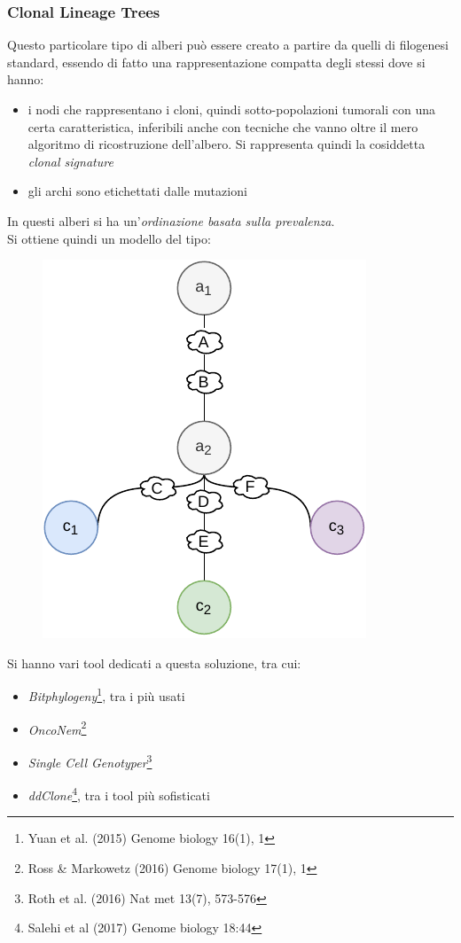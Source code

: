 \documentclass[a4paper,12pt, oneside]{book}
\begin{document}
\subsubsection{Clonal Lineage Trees}
Questo particolare tipo di alberi può essere creato a partire da quelli di
filogenesi standard, essendo di fatto una rappresentazione compatta degli stessi
dove si hanno:
\begin{itemize}
  \item i nodi che rappresentano i cloni, quindi sotto-popolazioni tumorali con
  una certa caratteristica, inferibili anche con tecniche che vanno oltre il
  mero algoritmo di ricostruzione dell'albero. Si rappresenta quindi la
  cosiddetta \textit{clonal signature}
  \item gli archi sono etichettati dalle mutazioni
\end{itemize}
In questi alberi si ha un'\textit{ordinazione basata sulla prevalenza}.\\
Si ottiene quindi un modello del tipo:
\begin{figure}[H]
  \centering
  \includegraphics[scale = 0.9]{img/ct.pdf}
\end{figure}
Si hanno vari tool dedicati a questa soluzione, tra cui:
\begin{itemize}
  \item \textit{Bitphylogeny}\footnote{Yuan et al. (2015) Genome biology 16(1),
    1}, tra i più usati
  \item \textit{OncoNem}\footnote{Ross \& Markowetz (2016) Genome biology 17(1),
    1} 
  \item \textit{Single Cell Genotyper}\footnote{Roth et al. (2016) Nat met
    13(7), 573-576} 
  \item \textit{ddClone}\footnote{Salehi et al (2017) Genome biology 18:44}, tra
  i tool più sofisticati
\end{itemize}
\end{document}
